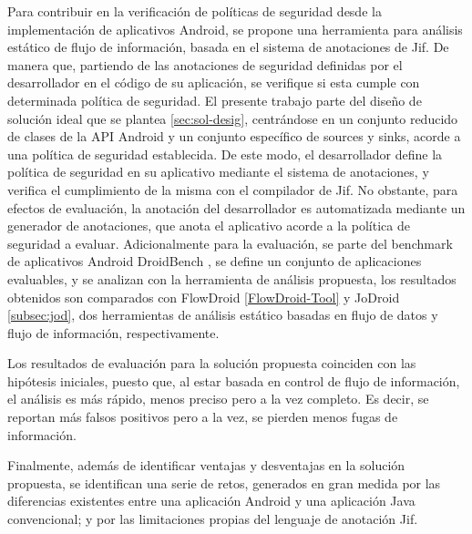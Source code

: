 Para contribuir en la verificación de políticas de seguridad desde la
implementación de aplicativos Android, se propone una herramienta para análisis
estático de flujo de información, basada en el sistema de anotaciones de Jif.
De manera que, partiendo de las anotaciones de seguridad definidas por el
desarrollador en el código de su aplicación, se verifique si esta cumple 
con determinada política de seguridad.\newline
El presente trabajo parte del diseño de solución ideal que se plantea
\ref{sec:sol-desig}, centrándose en un conjunto reducido de clases de la API
Android y un conjunto específico de sources y sinks, acorde a una política de
seguridad establecida.\newline 
De este modo, el desarrollador define la política de seguridad en su
aplicativo mediante el sistema de anotaciones, y verifica el cumplimiento de la
misma con el compilador de Jif.\newline  
No obstante, para efectos de evaluación, la anotación del desarrollador es
automatizada mediante un generador de anotaciones, que anota el aplicativo
acorde a la política de seguridad a evaluar.\newline
Adicionalmente para la evaluación, se parte del benchmark de aplicativos Android
DroidBench \cite{DroidBenchBenchmarks}, se define un conjunto de aplicaciones
evaluables, y se analizan con la herramienta de análisis propuesta, los
resultados obtenidos son comparados con FlowDroid \ref{FlowDroid-Tool} y
JoDroid \ref{subsec:jod}, dos herramientas de análisis estático basadas en
flujo de datos y flujo de información, respectivamente.

Los resultados de evaluación para la solución propuesta coinciden con las
hipótesis iniciales, puesto que, al estar basada en control de flujo de
información, el análisis es más rápido, menos preciso pero a la vez completo. Es
decir, se reportan más falsos positivos pero a la vez, se pierden menos fugas de
información.

Finalmente, además de identificar ventajas y desventajas en la solución
propuesta, se identifican una serie de retos, generados en gran medida por las
diferencias existentes entre una aplicación Android y una aplicación Java
convencional; y por las limitaciones propias del lenguaje de anotación Jif.























